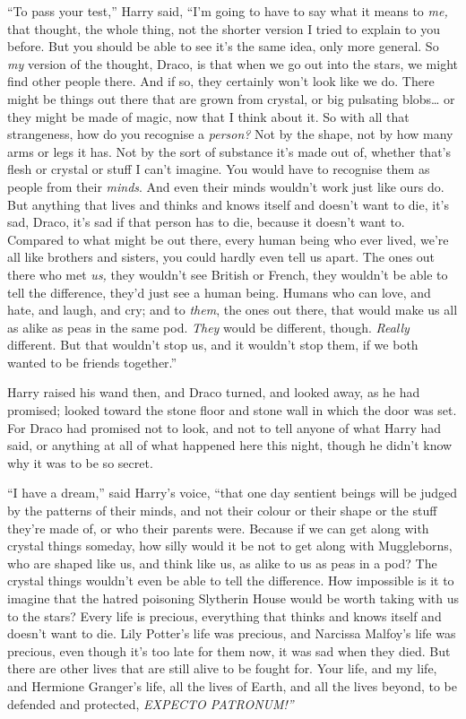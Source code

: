 ``To pass your test,'' Harry said, ``I'm going to have to say what it
means to \emph{me,} that thought, the whole thing, not the shorter
version I tried to explain to you before. But you should be able to see
it's the same idea, only more general. So \emph{my} version of the
thought, Draco, is that when we go out into the stars, we might find
other people there. And if so, they certainly won't look like we do.
There might be things out there that are grown from crystal, or big
pulsating blobs\ldots{} or they might be made of magic, now that I think
about it. So with all that strangeness, how do you recognise a
\emph{person?} Not by the shape, not by how many arms or legs it has.
Not by the sort of substance it's made out of, whether that's flesh or
crystal or stuff I can't imagine. You would have to recognise them as
people from their \emph{minds}. And even their minds wouldn't work just
like ours do. But anything that lives and thinks and knows itself and
doesn't want to die, it's sad, Draco, it's sad if that person has to
die, because it doesn't want to. Compared to what might be out there,
every human being who ever lived, we're all like brothers and sisters,
you could hardly even tell us apart. The ones out there who met
\emph{us,} they wouldn't see British or French, they wouldn't be able to
tell the difference, they'd just see a human being. Humans who can love,
and hate, and laugh, and cry; and to \emph{them}, the ones out there,
that would make us all as alike as peas in the same pod. \emph{They}
would be different, though. \emph{Really} different. But that wouldn't
stop us, and it wouldn't stop them, if we both wanted to be friends
together.''

Harry raised his wand then, and Draco turned, and looked away, as he had
promised; looked toward the stone floor and stone wall in which the door
was set. For Draco had promised not to look, and not to tell anyone of
what Harry had said, or anything at all of what happened here this
night, though he didn't know why it was to be so secret.

``I have a dream,'' said Harry's voice, ``that one day sentient beings
will be judged by the patterns of their minds, and not their colour or
their shape or the stuff they're made of, or who their parents were.
Because if we can get along with crystal things someday, how silly would
it be not to get along with Muggleborns, who are shaped like us, and
think like us, as alike to us as peas in a pod? The crystal things
wouldn't even be able to tell the difference. How impossible is it to
imagine that the hatred poisoning Slytherin House would be worth taking
with us to the stars? Every life is precious, everything that thinks and
knows itself and doesn't want to die. Lily Potter's life was precious,
and Narcissa Malfoy's life was precious, even though it's too late for
them now, it was sad when they died. But there are other lives that are
still alive to be fought for. Your life, and my life, and Hermione
Granger's life, all the lives of Earth, and all the lives beyond, to be
defended and protected, \emph{EXPECTO PATRONUM!''}

